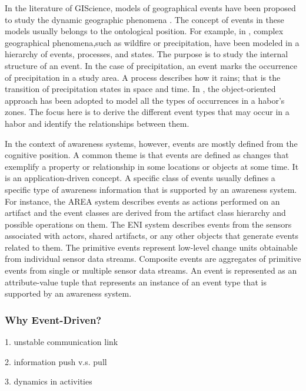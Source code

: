 In the literature of GIScience, models of geographical events have been proposed to study the dynamic geographic phenomena \cite{worboys2005a}. The concept of events in these models usually belongs to the ontological position. For example, in \cite{YuanApril20011523-0406-83}, complex geographical phenomena,such as wildfire or precipitation, have been modeled in a hierarchy of events, processes, and states. The purpose is to study the internal structure of an event. In the case of precipitation, an event marks the occurrence of precipitation in a study area. A process describes how it rains; that is the transition of precipitation states in space and time. In \cite{rodriguez2005a}, the object-oriented approach has been adopted to model all the types of occurrences in a habor's zones. The focus here is to derive the different event types that may occur in a habor and identify the relationships between them.   

In the context of awareness systems, however, events are mostly defined from the cognitive position. A common theme is that events are defined as changes that exemplify a property or relationship in some locations or objects at some time. It is an application-driven concept. A specific class of events usually defines a specific type of awareness information that is supported by an awareness system. For instance, the AREA system \cite{fuchs1999a} describes events as actions performed on an artifact and the event classes are derived from the artifact class hierarchy and possible operations on them. The ENI system \cite{gross2004a} describes events from the sensors associated with actors, shared artifacts, or any other objects that generate events related to them. The primitive events represent low-level change units obtainable from individual sensor data streams. Composite events are aggregates of primitive events from single or multiple sensor data streams. An event is represented as an attribute-value tuple that represents an instance of an event type that is supported by an awareness system.

\subsubsection{Why Event-Driven?} %
\label{ssub:why_event_driven_}

1. unstable communication link

2. information push v.s. pull

3. dynamics in activities

